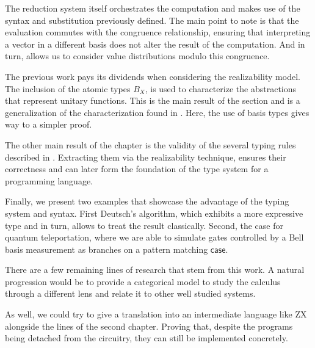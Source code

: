 \documentclass[runningheads,orivec,envcountsame,envcountsect]{llncs}
\newcommand\basis[1]{\ensuremath{B_{ #1 }}}
\begin{document}
The reduction system itself orchestrates the computation and makes use of the syntax and substitution previously defined. The main point to note is that the evaluation commutes with the congruence relationship, ensuring that interpreting a vector in a different basis does not alter the result of the computation. And in turn, allows us to consider value distributions modulo this congruence.

The previous work pays its dividends when considering the realizability model. The inclusion of the atomic types $\basis{X}$, is used to characterize the abstractions that represent unitary functions. This is the main result of the section and is a generalization of the characterization found in \cite{DiazcaroGuillermoMiquelValironLICS19}. Here, the use of basis types gives way to a simpler proof. 

The other main result of the chapter is the validity of the several typing rules described in . Extracting them via the realizability technique, ensures their correctness and can later form the foundation of the type system for a programming language.

Finally, we present two examples that showcase the advantage of the typing system and syntax. First Deutsch's algorithm, which exhibits a more expressive type and in turn, allows to treat the result classically. Second, the case for quantum teleportation, where we are able to simulate gates controlled by a Bell basis measurement as branches on a pattern matching $\mathsf{case}$. 

There are a few remaining lines of research that stem from this work. A natural progression would be to provide a categorical model to study the calculus through a different lens and relate it to other well studied systems. 

As well, we could try to give a translation into an intermediate language like ZX alongside the lines of the second chapter. Proving that, despite the programs being detached from the circuitry, they can still be  implemented concretely.

\end{document}
